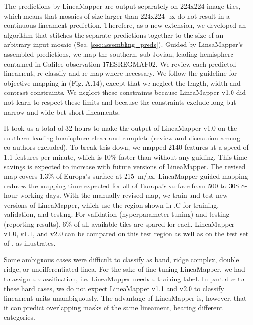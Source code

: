 The predictions by LineaMapper are output separately on 224x224 image tiles, which means that mosaics of size larger than 224x224~px do not result in a continuous lineament prediction. Therefore, as a new extension, we developed an algorithm that stitches the separate predictions together to the size of an arbitrary input mosaic (Sec. \ref{sec:assembling_preds}). 
Guided by LineaMapper’s assembled predictions, we map the southern, sub-Jovian, leading hemisphere contained in Galileo observation 17ESREGMAP02. We review each predicted lineament, re-classify and re-map where necessary. We follow the guideline for objective mapping in (Fig. A.14), except that we neglect the length, width and contrast constraints. We neglect these constraints because LineaMapper v1.0 did not learn to respect these limits and because the constraints exclude long but narrow and wide but short lineaments.

It took us a total of 32 hours to make the output of LineaMapper v1.0 on the southern leading hemisphere clean and complete (review and discussion among co-authors excluded). To break this down, we mapped 2140 features at a speed of 1.1 features per minute, which is 10\% faster than without any guiding. This time savings is expected to increase with future versions of LineaMapper. The revised map covers 1.3\% of Europa's surface at 215~m/px. LineaMapper-guided mapping reduces the mapping time expected for all of Europa's surface from 500 to 308 8-hour working days. 
With the manually revised map, we train and test new versions of LineaMapper, which use the region shown in .C for training, validation, and testing. For validation (hyperparameter tuning) and testing (reporting results), 6\% of all available tiles are spared for each. LineaMapper v1.0, v1.1, and v2.0 can be compared on this test region as well as on the test set of , as  illustrates.

Some ambiguous cases were difficult to classify as band, ridge complex, double ridge, or undifferentiated linea. For the sake of fine-tuning LineaMapper, we had to assign a classification, i.e. LineaMapper needs a training label. In part due to these hard cases, we do not expect LineaMapper v1.1 and v2.0 to classify lineament units unambiguously. The advantage of LineaMapper is, however, that it can predict overlapping masks of the same lineament, bearing different categories. 

